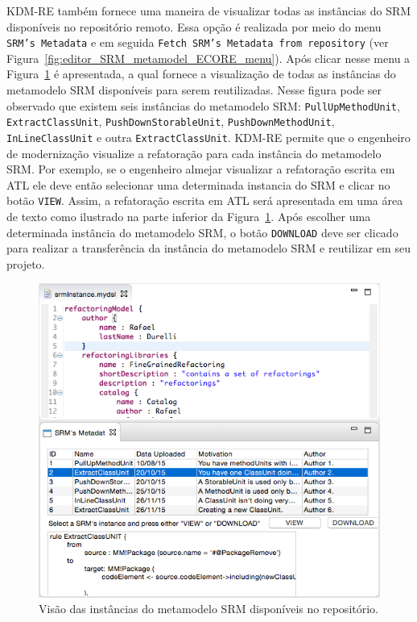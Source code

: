 KDM-RE também fornece uma maneira de visualizar todas as instâncias do SRM disponíveis no repositório remoto. Essa opção é realizada por meio do menu \texttt{SRM's Metadata} e em seguida \texttt{Fetch SRM's Metadata from repository} (ver Figura~\ref{fig:editor_SRM_metamodel_ECORE_menu}). Após clicar nesse menu a Figura~\ref{fig:download_kDM_re_repository} é apresentada, a qual fornece a visualização de todas as instâncias do metamodelo SRM disponíveis para serem reutilizadas. Nesse figura pode ser observado que existem seis instâncias do metamodelo SRM: \texttt{PullUpMethodUnit}, \texttt{ExtractClassUnit}, \texttt{PushDownStorableUnit}, \texttt{PushDownMethodUnit}, \texttt{InLineClassUnit} e outra \texttt{ExtractClassUnit}. KDM-RE permite que o engenheiro de modernização visualize a refatoração para cada instância do metamodelo SRM. Por exemplo, se o engenheiro almejar visualizar a refatoração escrita em ATL ele deve então selecionar uma determinada instancia do SRM e clicar no botão \texttt{VIEW}. Assim, a refatoração escrita em ATL será apresentada em uma área de texto como ilustrado na parte inferior da Figura~\ref{fig:download_kDM_re_repository}. Após escolher uma determinada instância do metamodelo SRM, o botão \texttt{DOWNLOAD} deve ser clicado para realizar a transferência da instância do metamodelo SRM e reutilizar em seu projeto. 

\begin{figure}[!h]
	\centering
	\caption{Visão das instâncias do metamodelo SRM disponíveis no repositório.}
	\label{fig:download_kDM_re_repository}
	\includegraphics[scale=0.7]{images/DOWNLOAD_KDM_RE}
	\fautor
\end{figure}


